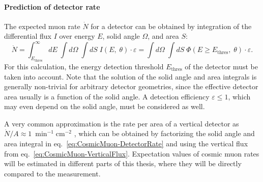 \paragraph{Prediction of detector rate}
The expected muon rate $\dot{N}$ for a detector can be obtained by integration of the differential flux $I$ over energy $E$, solid angle $\Omega$, and area $S$:
\begin{equation}
    \dot{N} = \int_{E_\text{thres}}^{\infty} dE \; \int d\Omega \; \int dS\; I(E,\;\theta) \cdot \varepsilon = \int d\Omega \; \int dS\; \Phi(E \geq E_\text{thres},\;\theta) \cdot \varepsilon. %
    \label{eq:CosmicMuon-DetectorRate}
\end{equation}
For this calculation, the energy detection threshold $E_\text{thres}$ of the detector must be taken into account. Note that the solution of the solid angle and area integrals is generally non-trivial for arbitrary detector geometries, since the effective detector area usually is a function of the solid angle. A detection efficiency $\varepsilon \leq 1$, which may even depend on the solid angle, must be considered as well.
\par A very common approximation is the rate per area of a vertical detector as $\dot{N}/A \approx \SI{1}{\min^{-1}\centi\meter^{-2}}$ \cite{PDG2022}, which can be obtained by factorizing the solid angle and area integral in eq.\ \ref{eq:CosmicMuon-DetectorRate} and using the vertical flux from eq.\ \ref{eq:CosmicMuon-VerticalFlux}. Expectation values of cosmic muon rates will be estimated in different parts of this thesis, where they will be directly compared to the measurement.



